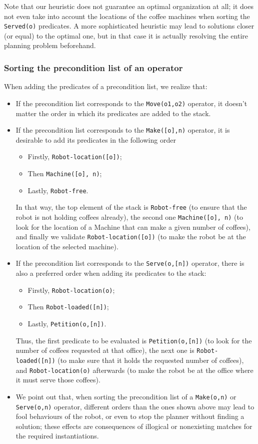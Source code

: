 \documentclass[12pt,a4paper,oneside]{article}
\numberwithin{equation}{section}
\numberwithin{equation}{section}
\theoremstyle{definition}
\begin{document}
Note that our heuristic does not guarantee an optimal organization at all; it does not even take into account the locations of the coffee machines when sorting the \texttt{Served(o)} predicates. A more sophisticated heuristic may lead to solutions closer (or equal) to the optimal one, but in that case it is actually resolving the entire planning problem beforehand.


\subsubsection{Sorting the precondition list of an operator}

When adding the predicates of a precondition list, we realize that:
\begin{itemize}
	\item If the precondition list corresponds to the \texttt{Move(o1,o2)} operator, it doesn’t matter the order in which its predicates are added to the stack. 
	\item If the precondition list corresponds to the \texttt{Make([o],n)} operator, it is desirable to add its predicates in the following order
	\begin{itemize}
		\item Firstly, \texttt{Robot-location([o])};
		\item Then \texttt{Machine([o], n)};
		\item Lastly, \texttt{Robot-free}.
	\end{itemize}
	In that way, the top element of the stack is \texttt{Robot-free} (to ensure that the robot is not holding coffees already), the second one \texttt{Machine([o], n)} (to look for the location of a Machine that can make a given number of coffees), and finally we validate \texttt{Robot-location([o])} (to make the robot be at the location of the selected machine). 
	\item If the precondition list corresponds to the \texttt{Serve(o,[n])} operator, there is also a preferred order when adding its predicates to the stack:
	\begin{itemize}
		\item Firstly, \texttt{Robot-location(o)};
		\item Then \texttt{Robot-loaded([n])};
		\item Lastly, \texttt{Petition(o,[n])}.
	\end{itemize}
	Thus, the first predicate to be evaluated is \texttt{Petition(o,[n])} (to look for the number of coffees requested at that office), the next one is \texttt{Robot-loaded([n])} (to make sure that it holds the requested number of coffees), and \texttt{Robot-location(o)} afterwards (to make the robot be at the office where it must serve those coffees). 
	\item We point out that, when sorting the precondition list of a \texttt{Make(o,n)} or \texttt{Serve(o,n)} operator, different orders than the ones shown above may lead to fool behaviours of the robot, or even to stop the planner without finding a solution; these effects are consequences of illogical or nonexisting matches for the required instantiations. 
\end{itemize}
\end{document}
